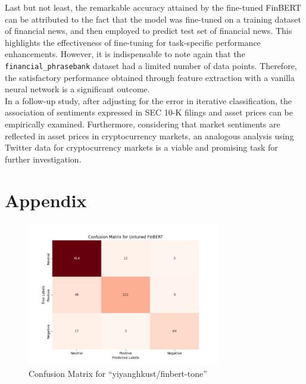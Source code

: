 \documentclass{article}
\begin{document}
\noindent Last but not least, the remarkable accuracy attained by the fine-tuned FinBERT can be attributed to the fact that the model was fine-tuned on a training dataset of financial news, and then employed to predict test set of financial news. This highlights the effectiveness of fine-tuning for task-specific performance enhancements. However, it is indispensable to note again that the \texttt{financial\_phrasebank} dataset had a limited number of data points. Therefore, the satisfactory performance obtained through feature extraction with a vanilla neural network is a significant outcome. \\

\noindent In a follow-up study, after adjusting for the error in iterative classification, the association of sentiments expressed in SEC 10-K filings and asset prices can be empirically examined. Furthermore, considering that market sentiments are reflected in asset prices in cryptocurrency markets, an analogous analysis using Twitter data for cryptocurrency markets is a viable and promising task for further investigation.

\newpage




\newpage

\section*{Appendix}\label{sec:appendix}

\begin{figure}[!htbp]
    \centering
    \includegraphics[width=0.75\textwidth]{assets/conf_mat_untuned.png}
    \caption{Confusion Matrix for ``yiyanghkust/finbert-tone''}
    \label{fig:untuned}
\end{figure}
\end{document}
